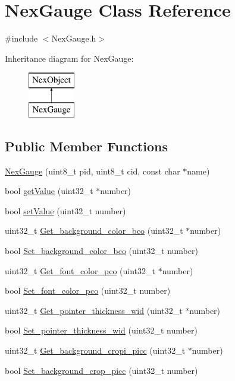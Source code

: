\hypertarget{class_nex_gauge}{\section{Nex\+Gauge Class Reference}
\label{class_nex_gauge}
}


{\ttfamily \#include $<$Nex\+Gauge.\+h$>$}

Inheritance diagram for Nex\+Gauge\+:\begin{figure}[H]
\begin{center}
\leavevmode
\includegraphics[height=2.000000cm]{class_nex_gauge}
\end{center}
\end{figure}
\subsection*{Public Member Functions}
\begin{DoxyCompactItemize}
\item 
\hyperlink{class_nex_gauge_ac79040067d42f7f1ba16cc4a1dfd8b9b}{Nex\+Gauge} (uint8\+\_\+t pid, uint8\+\_\+t cid, const char $\ast$name)
\item 
bool \hyperlink{class_nex_gauge_aeea8933513ebba11584ad97f8c8b5e69}{get\+Value} (uint32\+\_\+t $\ast$number)
\item 
bool \hyperlink{class_nex_gauge_a448ce9ad69f54c156c325d578a96b765}{set\+Value} (uint32\+\_\+t number)
\item 
uint32\+\_\+t \hyperlink{class_nex_gauge_a03a6441159939961b64728dded177e92}{Get\+\_\+background\+\_\+color\+\_\+bco} (uint32\+\_\+t $\ast$number)
\item 
bool \hyperlink{class_nex_gauge_a2d2fe2d81da81e14a66260c501d644b3}{Set\+\_\+background\+\_\+color\+\_\+bco} (uint32\+\_\+t number)
\item 
uint32\+\_\+t \hyperlink{class_nex_gauge_a830152d58485d55f475376261d52ff62}{Get\+\_\+font\+\_\+color\+\_\+pco} (uint32\+\_\+t $\ast$number)
\item 
bool \hyperlink{class_nex_gauge_ace00cba20b5cf5e1374c1a57bbf9a5f5}{Set\+\_\+font\+\_\+color\+\_\+pco} (uint32\+\_\+t number)
\item 
uint32\+\_\+t \hyperlink{class_nex_gauge_a50b4daf1b8dfb3cc5c329a3664341e11}{Get\+\_\+pointer\+\_\+thickness\+\_\+wid} (uint32\+\_\+t $\ast$number)
\item 
bool \hyperlink{class_nex_gauge_adacdbcb25fdf45654ebc88f572e3bce9}{Set\+\_\+pointer\+\_\+thickness\+\_\+wid} (uint32\+\_\+t number)
\item 
uint32\+\_\+t \hyperlink{class_nex_gauge_a0a6b394a16b03beb6046ec3795d409fe}{Get\+\_\+background\+\_\+cropi\+\_\+picc} (uint32\+\_\+t $\ast$number)
\item 
bool \hyperlink{class_nex_gauge_a223fa8a91a87439047f22ca1c33660df}{Set\+\_\+background\+\_\+crop\+\_\+picc} (uint32\+\_\+t number)
\end{DoxyCompactItemize}
